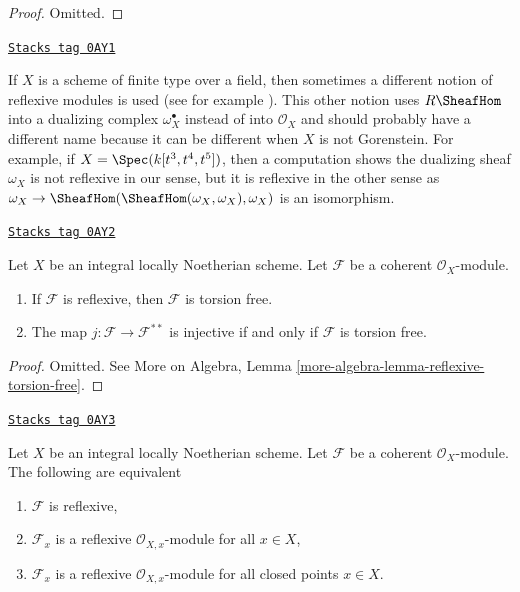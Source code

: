 \begin{proof}
Omitted.
\end{proof}

\begin{remark}
\label{divisors-remark-different-reflexive}
\href{https://stacks.math.columbia.edu/tag/0AY1}{\texttt{Stacks tag 0AY1}}

If $X$ is a scheme of finite type over a field, then sometimes a different
notion of reflexive modules is used (see for example
\cite[bottom of page 5 and Definition 1.1.9]{HL}).
This other notion uses $R\SheafHom$ into a dualizing complex
$\omega_X^\bullet$ instead of into $\mathcal{O}_X$ and
should probably have a different name because it can be different
when $X$ is not Gorenstein. For example, if
$X = \Spec(k[t^3, t^4, t^5])$, then a computation shows the dualizing
sheaf $\omega_X$ is not reflexive in our sense, but it is reflexive in the
other sense as
$\omega_X \to \SheafHom(\SheafHom(\omega_X, \omega_X), \omega_X)$
is an isomorphism.
\end{remark}

\begin{lemma}
\label{divisors-lemma-reflexive-torsion-free}
\href{https://stacks.math.columbia.edu/tag/0AY2}{\texttt{Stacks tag 0AY2}}

Let $X$ be an integral locally Noetherian scheme. Let $\mathcal{F}$
be a coherent $\mathcal{O}_X$-module.
\begin{enumerate}
\item If $\mathcal{F}$ is reflexive, then $\mathcal{F}$ is torsion free.
\item The map $j : \mathcal{F} \longrightarrow \mathcal{F}^{**}$
is injective if and only if $\mathcal{F}$ is torsion free.
\end{enumerate}
\end{lemma}

\begin{proof}
Omitted. See More on Algebra, Lemma
\ref{more-algebra-lemma-reflexive-torsion-free}.
\end{proof}

\begin{lemma}
\label{divisors-lemma-check-reflexive}
\href{https://stacks.math.columbia.edu/tag/0AY3}{\texttt{Stacks tag 0AY3}}

Let $X$ be an integral locally Noetherian scheme.
Let $\mathcal{F}$ be a coherent $\mathcal{O}_X$-module.
The following are equivalent
\begin{enumerate}
\item $\mathcal{F}$ is reflexive,
\item $\mathcal{F}_x$ is a reflexive $\mathcal{O}_{X, x}$-module
for all $x \in X$,
\item $\mathcal{F}_x$ is a reflexive $\mathcal{O}_{X, x}$-module
for all closed points $x \in X$.
\end{enumerate}
\end{lemma}

